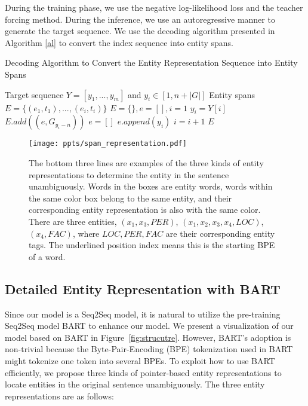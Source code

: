 \documentclass[11pt,a4paper]{article}
\begin{document}
During the training phase, we use the negative log-likelihood loss and the teacher forcing method. During the inference, we use an autoregressive manner to generate the target sequence. We use the decoding algorithm presented in Algorithm \ref{al} to convert the index sequence into entity spans.


\begin{algorithm}[!bht]
  \begin{algorithmic}[1]
    \caption{Decoding Algorithm to Convert the Entity Representation Sequence into Entity Spans} \label{al}
    \Require Target sequence $Y=[y_1, ..., y_{m}]$ and $y_i \in [1, n+|G|]$
    \Ensure  Entity spans $E=\{(e_1,t_1), ..., (e_i,t_i)\}$
    \State $E=\{\}, e=[], i=1$
      \State $y_i = Y[i]$
          \State $E.add((e, G_{y_i-n}))$
        \EndIf
        \State $e=[]$
      \Else
      \State $e.append(y_i)$
      \EndIf
      \State $i=i+1$
    \EndWhile
    \State \Return $E$
  \end{algorithmic}
\end{algorithm}


\begin{figure}[!bht]
\centering
  \texttt{[image: ppts/span\_representation.pdf]}
  \caption{The bottom three lines are examples of the three kinds of entity representations to determine the entity in the sentence unambiguously. Words in the boxes are entity words, words within the same color box belong to the same entity, and their corresponding entity representation is also with the same color. There are three entities, $(x_1, x_3, PER)$, $(x_1, x_2, x_3, x_4, LOC)$, $(x_4, FAC)$, where $LOC,PER,FAC$ are their corresponding entity tags. The underlined position index means this is the starting BPE of a word.}\label{fig:span_representation}
\end{figure}






\subsection{Detailed Entity Representation with BART}
Since our model is a Seq2Seq model, it is natural to utilize the pre-training Seq2Seq model BART to enhance our model. We present a visualization of our model based on BART in Figure~\ref{fig:strucutre}. However, BART's adoption is non-trivial because the Byte-Pair-Encoding (BPE) tokenization used in BART might tokenize one token into several BPEs. To exploit how to use BART efficiently, we propose three kinds of pointer-based entity representations to locate entities in the original sentence unambiguously. The three entity representations are as follows:
\end{document}
